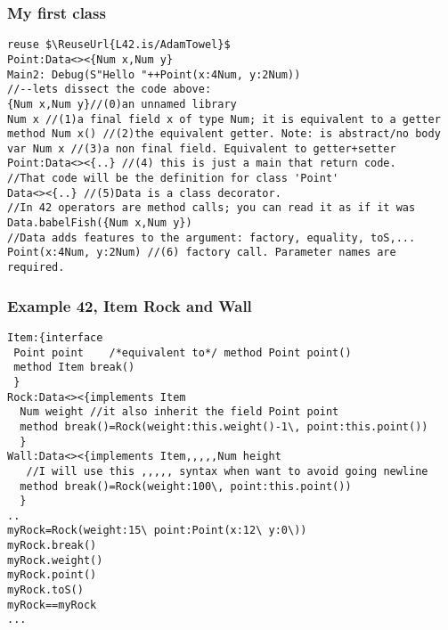 \begin{frame}[fragile]
\frametitle{My first class}
\begin{NiceCode}{59ex}{0.8}
\begin{lstlisting}
reuse $\ReuseUrl{L42.is/AdamTowel}$
Point:Data<><{Num x,Num y}
Main2: Debug(S"Hello "++Point(x:4Num, y:2Num))
//--lets dissect the code above:
{Num x,Num y}//(0)an unnamed library
Num x //(1)a final field x of type Num; it is equivalent to a getter
method Num x() //(2)the equivalent getter. Note: is abstract/no body
var Num x //(3)a non final field. Equivalent to getter+setter
Point:Data<><{..} //(4) this is just a main that return code.
//That code will be the definition for class 'Point'
Data<><{..} //(5)Data is a class decorator.
//In 42 operators are method calls; you can read it as if it was
Data.babelFish({Num x,Num y})
//Data adds features to the argument: factory, equality, toS,...
Point(x:4Num, y:2Num) //(6) factory call. Parameter names are required.
\end{lstlisting}
\end{NiceCode}
\end{frame}


\begin{frame}[fragile]
\frametitle{Example 42, Item Rock and Wall}
\begin{NiceCode}{59ex}{0.7}
\begin{lstlisting}
Item:{interface
 Point point    /*equivalent to*/ method Point point()
 method Item break()
 }
Rock:Data<><{implements Item
  Num weight //it also inherit the field Point point
  method break()=Rock(weight:this.weight()-1\, point:this.point())
  }
Wall:Data<><{implements Item,,,,,Num height
   //I will use this ,,,,, syntax when want to avoid going newline
  method break()=Rock(weight:100\, point:this.point())
  }
..
myRock=Rock(weight:15\ point:Point(x:12\ y:0\))
myRock.break()
myRock.weight()
myRock.point()
myRock.toS()
myRock==myRock
...
\end{lstlisting}
\end{NiceCode}
\end{frame}


